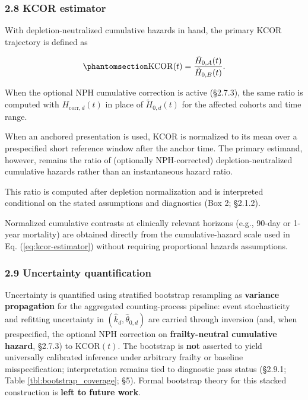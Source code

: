 \documentclass[
]{article}
\begin{document}
\subsubsection{2.8 KCOR estimator}\label{kcor-estimator}

With depletion-neutralized cumulative hazards in hand, the primary KCOR
trajectory is defined as

\begin{equation}\protect\phantomsection\label{eq:kcor-estimator}{
\mathrm{KCOR}(t) = \frac{\tilde H_{0,A}(t)}{\tilde H_{0,B}(t)}.
}\end{equation}

When the optional NPH cumulative correction is active (§2.7.3), the same
ratio is computed with \(H_{\mathrm{corr},d}(t)\) in place of
\(\tilde H_{0,d}(t)\) for the affected cohorts and time range.

When an anchored presentation is used, KCOR is normalized to its mean
over a prespecified short reference window after the anchor time. The
primary estimand, however, remains the ratio of (optionally
NPH-corrected) depletion-neutralized cumulative hazards rather than an
instantaneous hazard ratio.

This ratio is computed after depletion normalization and is interpreted
conditional on the stated assumptions and diagnostics (Box 2; §2.1.2).

Normalized cumulative contrasts at clinically relevant horizons (e.g.,
90-day or 1-year mortality) are obtained directly from the
cumulative-hazard scale used in Eq. (\ref{eq:kcor-estimator}) without
requiring proportional hazards assumptions.

\subsubsection{2.9 Uncertainty
quantification}\label{uncertainty-quantification}

Uncertainty is quantified using stratified bootstrap resampling as
\textbf{variance propagation} for the aggregated counting-process
pipeline: event stochasticity and refitting uncertainty in
\((\hat{k}_d,\hat{\theta}_{0,d})\) are carried through inversion (and,
when prespecified, the optional NPH correction on
\textbf{frailty-neutral cumulative hazard}, §2.7.3) to
\(\mathrm{KCOR}(t)\). The bootstrap is \textbf{not} asserted to yield
universally calibrated inference under arbitrary frailty or baseline
misspecification; interpretation remains tied to diagnostic pass status
(§2.9.1; Table \ref{tbl:bootstrap_coverage}; §5). Formal bootstrap
theory for this stacked construction is \textbf{left to future work}.
\end{document}
